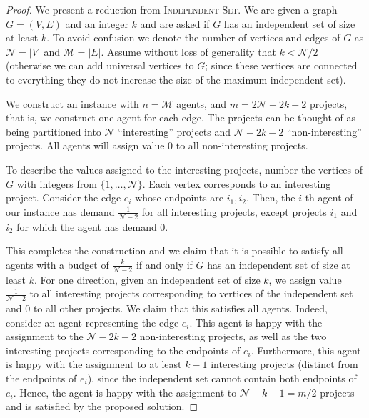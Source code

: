 \documentclass{article}
\begin{document}
\begin{proof}

We present a reduction from \textsc{Independent Set}. We are given a graph
$G=(V,E)$ and an integer $k$ and are asked if $G$ has an independent set of
size at least $k$.  To avoid confusion we denote the number of vertices and
edges of $G$ as $\mathscr{N}=|V|$ and $\mathscr{M}=|E|$. %
Assume without loss of generality that
$k<\mathscr{N}/2$ (otherwise we can add universal vertices to $G$; since these vertices
are connected to everything they do not increase the size of the maximum
independent set). 

We construct an instance with $n=\mathscr{M}$ agents, and $m=2\mathscr{N}-2k-2$ projects, that is,
we construct one agent for each edge. The projects can be thought of as being
partitioned into $\mathscr{N}$ ``interesting'' projects and $\mathscr{N}-2k-2$ ``non-interesting''
projects. All agents will assign value $0$ to all non-interesting projects.

To describe the values assigned to the interesting projects, number the
vertices of $G$ with integers from $\{1,\ldots,\mathscr{N}\}$. Each vertex corresponds to
an interesting project. Consider the edge $e_i$ whose endpoints are $i_1,i_2$.
Then, the $i$-th agent of our instance has demand $\frac{1}{\mathscr{N}-2}$ for all
interesting projects, except projects $i_1$ and $i_2$ for which the agent has
demand $0$.

This completes the construction and we claim that it is possible to satisfy all
agents with a budget of $\frac{k}{\mathscr{N}-2}$ if and only if $G$ has an independent
set of size at least $k$. For one direction, given an independent set of size $k$,
we assign value $\frac{1}{\mathscr{N}-2}$ to all interesting projects corresponding to
vertices of the independent set and $0$ to all other projects. We claim that
this satisfies all agents. Indeed, consider an agent representing the edge
$e_i$. This agent is happy with the assignment to the $\mathscr{N}-2k-2$ non-interesting
projects, as well as the two interesting projects corresponding to the
endpoints of $e_i$. Furthermore, this agent is happy with the assignment to at
least $k-1$ interesting projects (distinct from the
endpoints of $e_i$), since the independent set cannot contain both
endpoints of $e_i$. Hence, the agent is happy with the assignment to
$\mathscr{N}-k-1=m/2$ projects and is satisfied by the proposed solution.


\end{proof}
\end{document}

